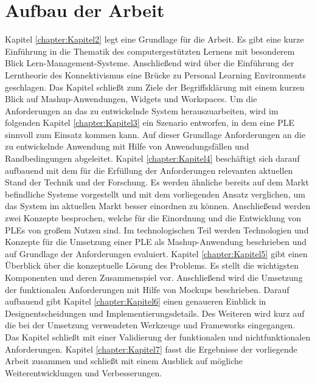 \section{Aufbau der Arbeit}
Kapitel \ref{chapter:Kapitel2} legt eine Grundlage für die Arbeit. Es gibt eine kurze Einführung in die Thematik des computergestützten Lernens mit besonderem Blick Lern-Management-Systeme. Anschließend wird über die Einführung der Lerntheorie des Konnektivismus eine Brücke zu Personal Learning Environments geschlagen. Das Kapitel schließt zum Ziele der Begriffsklärung mit einem kurzen Blick auf Mashup-Anwendungen, Widgets und Workspaces. Um die Anforderungen an das zu entwickelnde System herauszuarbeiten, wird im folgenden Kapitel \ref{chapter:Kapitel3} ein Szenario entworfen, in dem eine PLE sinnvoll zum Einsatz kommen kann. Auf dieser Grundlage Anforderungen an die zu entwickelnde Anwendung mit Hilfe von Anwendungsfällen und Randbedingungen abgeleitet. Kapitel \ref{chapter:Kapitel4} beschäftigt sich darauf aufbauend mit dem für die Erfüllung der Anforderungen relevanten aktuellen Stand der Technik und der Forschung. Es werden ähnliche bereits auf dem Markt befindliche Systeme vorgestellt und mit dem vorliegenden Ansatz verglichen, um das System im aktuellen Markt besser einordnen zu können. Anschließend werden zwei Konzepte besprochen, welche für die Einordnung und die Entwicklung von PLEs von großem Nutzen sind. Im technologischen Teil werden Technologien und Konzepte für die Umsetzung einer PLE als Mashup-Anwendung beschrieben und auf Grundlage der Anforderungen evaluiert. Kapitel \ref{chapter:Kapitel5} gibt einen Überblick über die konzeptuelle Lösung des Problems. Es stellt die wichtigsten Komponenten und deren Zusammenspiel vor. Anschließend wird die Umsetzung der funktionalen Anforderungen mit Hilfe von Mockups beschrieben. Darauf aufbauend gibt Kapitel \ref{chapter:Kapitel6} einen genaueren Einblick in Designentscheidungen und Implementierungsdetails. Des Weiteren wird kurz auf die bei der Umsetzung verwendeten Werkzeuge und Frameworks eingegangen. Das Kapitel schließt mit einer Validierung der funktionalen und nichtfunktionalen Anforderungen. Kapitel \ref{chapter:Kapitel7} fasst die Ergebnisse der vorliegende Arbeit zusammen und schließt mit einem Ausblick auf mögliche Weiterentwicklungen und Verbesserungen.
